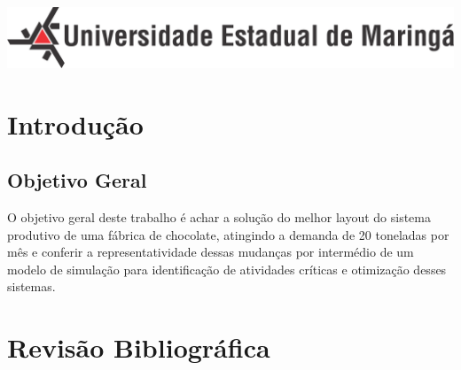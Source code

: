\documentclass[
	12pt,				%
	openright,			%
	oneside,			%
	a4paper,			%
	english,			%
	french,				%
	spanish,			%
	brazil				%
	]{abntex2}
\begin{document}
\begin{minipage}[c][0cm][c]{0cm} %

\centering

\includegraphics[scale=0.45]{../../Pictures/uem-modelo-04.png}  
\end{minipage}


\frenchspacing 


\imprimircapa



 
 


\tableofcontents*
\cleardoublepage

\textual

\chapter{Introdução}



\section{Objetivo Geral}

O objetivo geral deste trabalho é achar a solução do melhor layout do sistema produtivo de uma fábrica de chocolate, atingindo a demanda de 20 toneladas por mês e conferir a representatividade dessas mudanças por intermédio de um modelo de simulação para identificação de atividades críticas e otimização desses sistemas.


\chapter{Revisão Bibliográfica}
\end{document}
